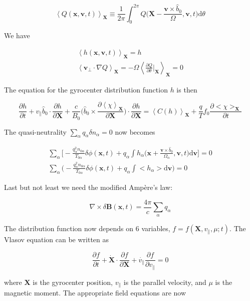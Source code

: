 \documentclass[
  notoc %
]{tufte-book}
\begin{document}
\[
\left< Q(\mathbf{x},\mathbf{v},t) \right>_\mathbf{X} \equiv \frac{1}{2\pi}\int_0^{2\pi}Q\Big( \mathbf{X}-\frac{\mathbf{v}\times\hat{b}_0}{\Omega},\mathbf{v},t \Big)\mathrm{d}\theta
\]

We have

\[
\begin{aligned}
\left< h(\mathbf{x},\mathbf{v},t) \right>_\mathbf{X} = h \\
\left< \mathbf{v}_\perp\cdot\nabla Q \right>_\mathbf{X} = -\Omega \left<  \frac{\partial Q}{\partial\theta}\bigg\rvert_\mathbf{X} \right>_\mathbf{X} = 0
\end{aligned}
\]

The equation for the gyrocenter distribution function \(h\) is then

\[
\frac{\partial h}{\partial t} + v_\parallel\hat{b}_0\cdot\frac{\partial h}{\partial\mathbf{X}} + \frac{c}{B_0}\Big( \hat{b}_0\times\frac{\partial\left<\chi\right>_\mathbf{X}}{\partial \mathbf{X}} \Big)\cdot\frac{\partial h}{\partial\mathbf{X}} = \left< C(h) \right>_\mathbf{X} + \frac{q}{T}f_0\frac{\partial <\chi>_\mathbf{X}}{\partial t}
\]

The quasi-neutrality \(\sum_\alpha q_\alpha\delta n_\alpha = 0\) now
becomes

\[
\begin{aligned}
\sum_\alpha\Big[ -\frac{q_\alpha^2 n_{0\alpha}}{T_{0\alpha}}\delta\phi(\mathbf{x},t) + q_\alpha\int h_\alpha\Big( \mathbf{x}+\frac{\mathbf{v}\times\hat{b}_0}{\Omega_\alpha},\mathbf{v},t \Big)\mathrm{d}\mathbf{v} \Big] = 0 \\
\sum_\alpha\Big( -\frac{q_\alpha^2 n_{0\alpha}}{T_{0\alpha}}\delta\phi(\mathbf{x},t) + q_\alpha \int <h_\alpha>\mathrm{d}\mathbf{v}\Big) = 0
\end{aligned}
\]

Last but not least we need the modified Ampère's law:

\[
\nabla\times\delta\mathbf{B}(\mathbf{x},t) = \frac{4\pi}{c}\sum_\alpha q_\alpha
\]

The distribution function now depends on 6 variables,
\(f = f(\mathbf{X},v_\parallel,\mu;t)\). The Vlasov equation can be
written as

\[
\frac{\partial f}{\partial t} + \dot{\mathbf{X}}\cdot\frac{\partial f}{\partial \mathbf{X}} + \dot{v_\parallel}\frac{\partial f}{\partial v_\parallel} = 0
\]

where \(\mathbf{X}\) is the gyrocenter position, \(v_\parallel\) is the
parallel velocity, and \(\mu\) is the magnetic moment. The appropriate
field equations are now
\end{document}
